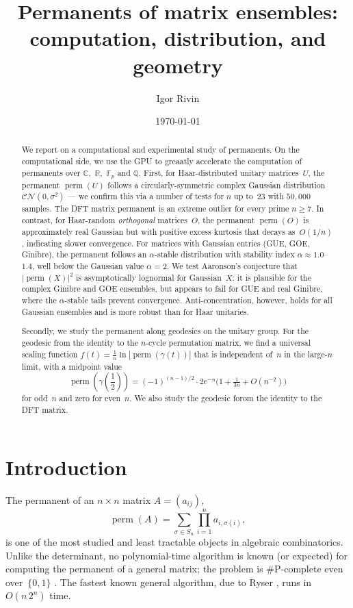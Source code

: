 \documentclass[11pt]{amsart}
\title{Permanents of matrix ensembles:\\computation, distribution, and geometry}
\author{Igor Rivin}
\date{\today}
\theoremstyle{definition}
\theoremstyle{remark}
\DeclareMathOperator{\perm}{perm}
\begin{document}
\begin{abstract}
We report on a computational and experimental study of permanents.  On the computational side, we use the GPU to greaatly accelerate the computation of permanents over $\mathbb{C},$ $\mathbb{R},$ $\mathbb{F}_p$ and $\mathbb{Q}.$ 
First, for Haar-distributed unitary matrices~$U$, the permanent
$\perm(U)$ follows a circularly-symmetric complex Gaussian
distribution $\mathcal{CN}(0,\sigma^2)$ --- we confirm this via
a number of tests
for $n$ up to~23 with $50{,}000$ samples.  The DFT matrix permanent is
an extreme outlier for every prime $n\ge 7$.  In
contrast, for Haar-random \emph{orthogonal} matrices~$O$, the permanent
$\perm(O)$ is approximately real Gaussian but with positive excess
kurtosis that decays as~$O(1/n)$, indicating slower convergence.
For matrices with Gaussian entries (GUE, GOE, Ginibre),  the permanent follows an $\alpha$-stable
distribution with stability index $\alpha\approx 1.0$--$1.4$,
well below the Gaussian value $\alpha=2$.  We test Aaronson's
conjecture that $|\perm(X)|^2$ is asymptotically lognormal for
Gaussian~$X$: it is plausible for the complex Ginibre and GOE
ensembles, but appears to fail for GUE and real Ginibre, where the
$\alpha$-stable tails prevent convergence.  Anti-concentration, however,
holds for all Gaussian ensembles and is more robust than for Haar
unitaries.

Secondly, we study the permanent along geodesics on the unitary group.  For the geodesic from the identity to the $n$-cycle
permutation matrix, we find a universal scaling function
$f(t)=\frac{1}{n}\ln|\perm(\gamma(t))|$ that is independent of~$n$
in the large-$n$ limit, with a midpoint value
\[
  \perm(\gamma({\textstyle\frac12}))
  = (-1)^{(n-1)/2}\cdot 2e^{-n}\bigl(1+\tfrac{1}{3n}+O(n^{-2})\bigr)
\]
for odd~$n$ and zero for even~$n$.
We also study the geodesic forom the identity to the DFT matrix.
\end{abstract}

\maketitle

\section{Introduction}

The permanent of an $n\times n$ matrix $A=(a_{ij})$,
\[
  \perm(A)=\sum_{\sigma\in S_n}\prod_{i=1}^n a_{i,\sigma(i)},
\]
is one of the most studied and least tractable objects in algebraic
combinatorics.  Unlike the determinant, no polynomial-time algorithm
is known (or expected) for computing the permanent of a general
matrix; the problem is \#P-complete even over~$\{0,1\}$
\cite{Valiant79}.  The fastest known general algorithm, due to Ryser
\cite{Ryser63}, runs in $O(n\,2^n)$ time.
\end{document}
